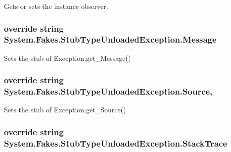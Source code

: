 Gets or sets the instance observer.

\hypertarget{class_system_1_1_fakes_1_1_stub_type_unloaded_exception_a3d444073e12588720c9c191dd832943f}{
\subsubsection[{Message}]{\setlength{\rightskip}{0pt plus 5cm}override string System.\-Fakes.\-Stub\-Type\-Unloaded\-Exception.\-Message\hspace{0.3cm}{\ttfamily [get]}}}\label{class_system_1_1_fakes_1_1_stub_type_unloaded_exception_a3d444073e12588720c9c191dd832943f}


Sets the stub of Exception.\-get\-\_\-\-Message()

\hypertarget{class_system_1_1_fakes_1_1_stub_type_unloaded_exception_aae3dc11216e4281b4cafc36dbb5bff72}{
\subsubsection[{Source}]{\setlength{\rightskip}{0pt plus 5cm}override string System.\-Fakes.\-Stub\-Type\-Unloaded\-Exception.\-Source\hspace{0.3cm}{\ttfamily [get]}, {\ttfamily [set]}}}\label{class_system_1_1_fakes_1_1_stub_type_unloaded_exception_aae3dc11216e4281b4cafc36dbb5bff72}


Sets the stub of Exception.\-get\-\_\-\-Source()

\hypertarget{class_system_1_1_fakes_1_1_stub_type_unloaded_exception_ac5d6e4421d8a2dff6b22fe031b28e341}{
\subsubsection[{Stack\-Trace}]{\setlength{\rightskip}{0pt plus 5cm}override string System.\-Fakes.\-Stub\-Type\-Unloaded\-Exception.\-Stack\-Trace\hspace{0.3cm}{\ttfamily [get]}}}\label{class_system_1_1_fakes_1_1_stub_type_unloaded_exception_ac5d6e4421d8a2dff6b22fe031b28e341}



